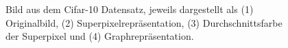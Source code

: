 \begin{figure}[t]
\centering
{}
  \caption[\gls{Cifar}-10]{Bild aus dem \gls{Cifar}-10 Datensatz, jeweils dargestellt als (1) Originalbild, (2) Superpixelrepräsentation, (3) Durchschnittsfarbe der Superpixel und (4) Graphrepräsentation.}
\label{fig:cifar_10}
\end{figure}
